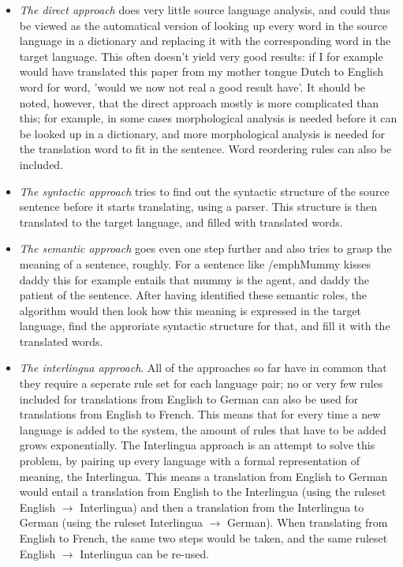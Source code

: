 \documentclass[12pt]{article}
\begin{document}
\begin{itemize}
\item \emph{The direct approach} does very little source language analysis, and could thus be viewed as the automatical version of looking up every word in the source language in a dictionary and replacing it with the corresponding word in the target language. This often doesn't yield very good results: if I for example would have translated this paper from my mother tongue Dutch to English word for word, 'would we now not real a good result have'. It should be noted, however, that the direct approach mostly is more complicated than this; for example, in some cases morphological analysis is needed before it can be looked up in a dictionary, and more morphological analysis is needed for the translation word to fit in the sentence. Word reordering rules can also be included.
\item \emph{The syntactic approach} tries to find out the syntactic structure of the source sentence before it starts translating, using a parser. This structure is then translated to the target language, and filled with translated words.
\item \emph{The semantic approach} goes even one step further and also tries to grasp the meaning of a sentence, roughly. For a sentence like /emph{Mummy kisses daddy} this for example entails that mummy is the agent, and daddy the patient of the sentence. After having identified these semantic roles, the algorithm would then look how this meaning is expressed in the target language, find the approriate syntactic structure for that, and fill it with the translated words.
\item \emph{The interlingua approach}. All of the approaches so far have in common that they require a seperate rule set for each language pair; no or very few rules included for translations from English to German can also be used for translations from English to French. This means that for every time a new language is added to the system, the amount of rules that have to be added grows exponentially. The Interlingua approach is an attempt to solve this problem, by pairing up every language with a formal representation of meaning, the Interlingua. This means a translation from English to German would entail a translation from English to the Interlingua (using the ruleset English $\rightarrow$ Interlingua) and then a translation from the Interlingua to German (using the ruleset Interlingua $\rightarrow$ German). When translating from English to French, the same two steps would be taken, and the same ruleset English $\rightarrow$ Interlingua can be re-used.
\end{itemize}
\end{document}
